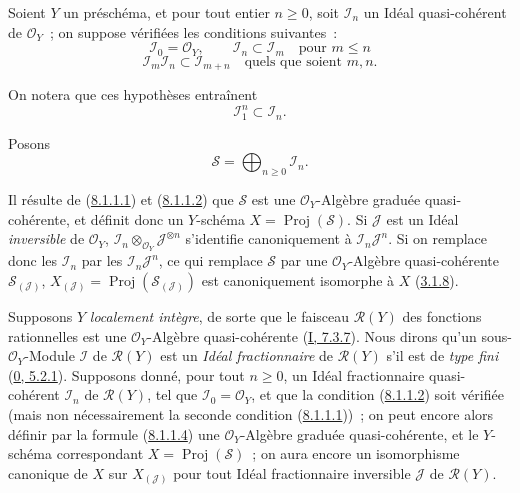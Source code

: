 \begin{env}[8.1.1]
\label{II.8.1.1-fr}
Soient $Y$ un préschéma, et pour tout entier $n\geq0$, soit $\mathcal{I}_n$ un
Idéal quasi-cohérent de $\mathcal{O}_Y$~; on suppose vérifiées les conditions
suivantes~:
\begin{equation}
\label{II.8.1.1.1-fr}
  \mathcal{I}_0=\mathcal{O}_Y,\qquad
  \mathcal{I}_n\subset\mathcal{I}_m\quad\text{pour }m\leq n
\tag{8.1.1.1}
\end{equation}
\begin{equation}
\label{II.8.1.1.2-fr}
  \mathcal{I}_m\mathcal{I}_n\subset\mathcal{I}_{m+n}
  \quad\text{quels que soient }m,n.
\tag{8.1.1.2}
\end{equation}

On notera que ces hypothèses entraînent
\begin{equation}
\label{II.8.1.1.3-fr}
  \mathcal{I}_1^n\subset\mathcal{I}_n.
\tag{8.1.1.3}
\end{equation}

Posons
\begin{equation}
\label{II.8.1.1.4-fr}
  \mathcal{S}=\bigoplus_{n\geq0}\mathcal{I}_n.
\tag{8.1.1.4}
\end{equation}

Il résulte de (\hyperref[II.8.1.1.1-fr]{8.1.1.1}) et
(\hyperref[II.8.1.1.2-fr]{8.1.1.2}) que $\mathcal{S}$ est une
$\mathcal{O}_Y$-Algèbre graduée quasi-cohérente, et définit donc un $Y$-schéma
$X=\operatorname{Proj}(\mathcal{S})$. Si $\mathcal{J}$ est un Idéal
\emph{inversible} de $\mathcal{O}_Y$,
$\mathcal{I}_n\otimes_{\mathcal{O}_Y}\mathcal{J}^{\otimes n}$ s'identifie
canoniquement à $\mathcal{I}_n\mathcal{J}^n$. Si on remplace donc les
$\mathcal{I}_n$ par les $\mathcal{I}_n\mathcal{J}^n$, ce qui remplace
$\mathcal{S}$ par une $\mathcal{O}_Y$-Algèbre quasi-cohérente
$\mathcal{S}_{(\mathcal{J})}$,
$X_{(\mathcal{J})}=\operatorname{Proj}(\mathcal{S}_{(\mathcal{J})})$ est
canoniquement isomorphe à $X$ (\hyperref[II.3.1.8-fr]{3.1.8}).
\end{env}

\begin{env}[8.1.2]
\label{II.8.1.2-fr}
Supposons $Y$ \emph{localement intègre}, de sorte que le faisceau
$\mathcal{R}(Y)$ des fonctions rationnelles est une $\mathcal{O}_Y$-Algèbre
quasi-cohérente (\hyperref[I.7.3.7-fr]{I, 7.3.7}). Nous dirons qu'un
sous-$\mathcal{O}_Y$-Module $\mathcal{I}$ de $\mathcal{R}(Y)$ est un
\emph{Idéal fractionnaire} de $\mathcal{R}(Y)$ s'il est de \emph{type fini}
(\hyperref[0.5.2.1-fr]{0, 5.2.1}). Supposons donné, pour tout $n\geq0$, un
Idéal fractionnaire quasi-cohérent $\mathcal{I}_n$ de $\mathcal{R}(Y)$, tel
que $\mathcal{I}_0=\mathcal{O}_Y$, et que la condition
(\hyperref[II.8.1.1.2-fr]{8.1.1.2}) soit vérifiée (mais non nécessairement la
seconde condition (\hyperref[II.8.1.1.1-fr]{8.1.1.1}))~; on peut encore alors
définir par la formule (\hyperref[II.8.1.1.4-fr]{8.1.1.4}) une
$\mathcal{O}_Y$-Algèbre graduée quasi-cohérente, et le $Y$-schéma correspondant
$X=\operatorname{Proj}(\mathcal{S})$~; on aura encore un isomorphisme
canonique de $X$ sur $X_{(\mathcal{J})}$ pour tout Idéal fractionnaire
inversible $\mathcal{J}$ de $\mathcal{R}(Y)$.
\end{env}

